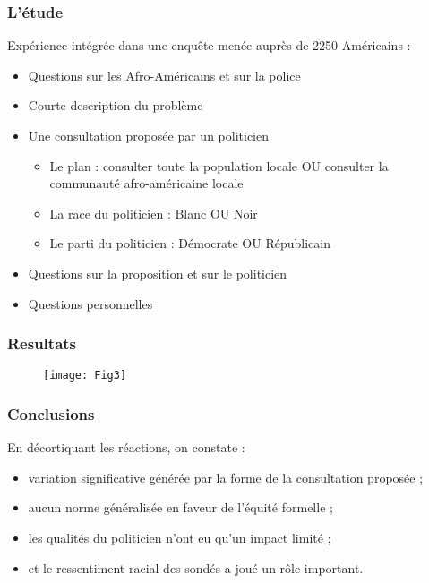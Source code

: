 \documentclass[14pt]{beamer}
\begin{document}
\begin{frame}
\frametitle{L'étude}
Expérience intégrée dans une enquête menée auprès de 2250 Américains :\\
\bigskip

\begin{itemize}
	\pause 
	\item Questions sur les Afro-Américains et sur la police  
	\pause 
	\item Courte description du problème 
	\pause 
	\item Une consultation proposée par un politicien  
	\begin{itemize}
		\pause 
		\item Le plan : consulter toute la population locale OU consulter la communauté afro-américaine locale
		\pause 
		\item La race du politicien : Blanc OU Noir 
		\pause 
		\item Le parti du politicien : Démocrate OU Républicain
	\end{itemize}
	\pause 
	\item Questions sur la proposition et sur le politicien
	\pause 
	\item Questions personnelles 
\end{itemize}
\end{frame}


\begin{frame}
	\frametitle{Resultats}
	\begin{figure}
		\texttt{[image: Fig3]}
	\end{figure}
\end{frame}

\begin{frame}
	\frametitle{Conclusions}
	En décortiquant les réactions, on constate :
	\begin{itemize}
		\pause 
		\item variation significative générée par la forme de la consultation proposée ;
		\pause 
		\item aucun norme généralisée en faveur de l'équité formelle ;  
		\pause 
		\item les qualités du politicien n'ont eu qu'un impact limité ;
		\pause 
		\item et le ressentiment racial des sondés a joué un rôle important. 
	\end{itemize}

\end{frame}
\end{document}
